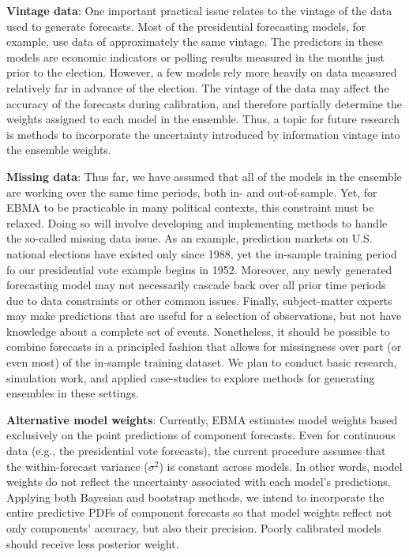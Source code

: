 \documentclass[pdftex,12pt,fullpage,oneside]{amsart}
\begin{document}
\textbf{Vintage data}: One important practical issue relates to the
vintage of the data used to generate forecasts.  Most of the
presidential forecasting models, for example, use data of
approximately the same vintage.  The predictors in these models are
economic indicators or polling results measured in the months just
prior to the election.  However, a few models rely more heavily on
data measured relatively far in advance of the election. The vintage
of the data may affect the accuracy of the forecasts during
calibration, and therefore partially determine the weights assigned to
each model in the ensemble.  Thus, a topic for future research is
methods to incorporate the uncertainty introduced by information
vintage into the ensemble weights.

\textbf{Missing data}: Thus far, we have assumed that all of the
models in the ensemble are working over the same time periods, both
in- and out-of-sample. Yet, for EBMA to be practicable in many
political contexts, this constraint must be relaxed.  Doing so will
involve developing and implementing methods to handle the so-called
missing data issue. As an example, prediction markets on U.S. national
elections have existed only since 1988, yet the in-sample training
period fo our presidential vote example begins in 1952.  Moreover, any
newly generated forecasting model may not necessarily cascade back
over all prior time periods due to data constraints or other common
issues. Finally, subject-matter experts may make predictions that are
useful for a selection of observations, but not have knowledge about a
complete set of events.  Nonetheless, it should be possible to combine
forecasts in a principled fashion that allows for missingness over
part (or even most) of the in-sample training dataset.  We plan to
conduct basic research, simulation work, and applied case-studies to
explore methods for generating ensembles in these settings.

\textbf{Alternative model weights}: Currently, EBMA estimates model
weights based exclusively on the point predictions of component
forecasts.  Even for continuous data (e.g., the presidential vote
forecasts), the current procedure assumes that the within-forecast
variance ($\sigma^2$) is constant across models.  In other words,
model weights do not reflect the uncertainty associated with each
model's predictions.  Applying both Bayesian and bootstrap methods, we
intend to incorporate the entire predictive PDFs of component
forecasts so that model weights reflect not only components' accuracy,
but also their precision.  Poorly calibrated models should receive less
posterior weight.
\end{document}
